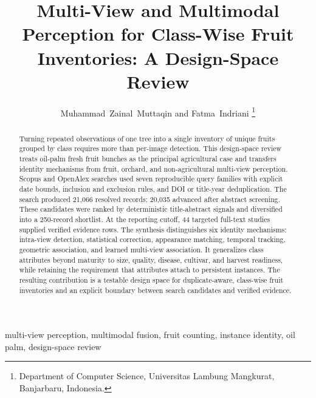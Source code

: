 \documentclass[journal]{IEEEtran}
\begin{document}
\title{Multi-View and Multimodal Perception for Class-Wise Fruit Inventories: A Design-Space Review}
\author{Muhammad~Zainal~Muttaqin and Fatma~Indriani%
\thanks{Department of Computer Science, Universitas Lambung Mangkurat, Banjarbaru, Indonesia.}}
\maketitle
\begin{abstract}
Turning repeated observations of one tree into a single inventory of unique fruits grouped by class requires more than per-image detection. This design-space review treats oil-palm fresh fruit bunches as the principal agricultural case and transfers identity mechanisms from fruit, orchard, and non-agricultural multi-view perception. Scopus and OpenAlex searches used seven reproducible query families with explicit date bounds, inclusion and exclusion rules, and DOI or title-year deduplication. The search produced 21,066 resolved records; 20,035 advanced after abstract screening. These candidates were ranked by deterministic title-abstract signals and diversified into a 250-record shortlist. At the reporting cutoff, 44 targeted full-text studies supplied verified evidence rows. The synthesis distinguishes six identity mechanisms: intra-view detection, statistical correction, appearance matching, temporal tracking, geometric association, and learned multi-view association. It generalizes class attributes beyond maturity to size, quality, disease, cultivar, and harvest readiness, while retaining the requirement that attributes attach to persistent instances. The resulting contribution is a testable design space for duplicate-aware, class-wise fruit inventories and an explicit boundary between search candidates and verified evidence.
\end{abstract}
\begin{IEEEkeywords}
multi-view perception, multimodal fusion, fruit counting, instance identity, oil palm, design-space review
\end{IEEEkeywords}



\end{document}
